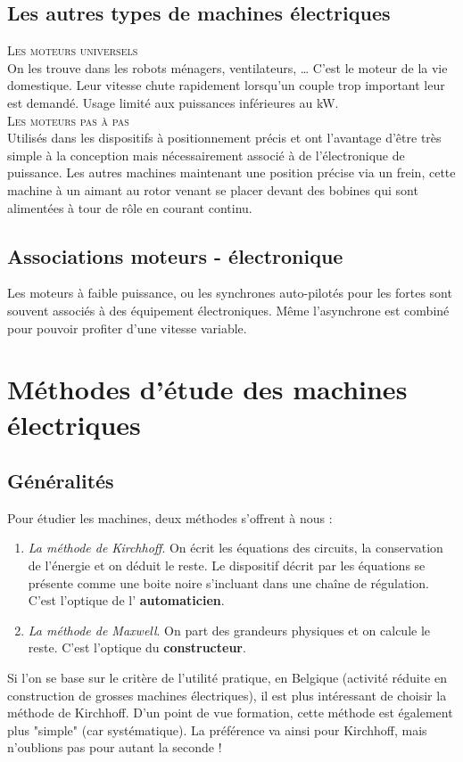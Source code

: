 	\subsection{Les autres types de machines électriques}
		\textsc{Les moteurs universels}\\
		On les trouve dans les robots ménagers, ventilateurs, \dots  
		C'est le moteur de la vie domestique. Leur vitesse chute 
		rapidement lorsqu'un couple trop important leur est demandé. Usage limité aux puissances inférieures au kW.\\
		
		\textsc{Les moteurs pas à pas}\\
		Utilisés dans les dispositifs à positionnement précis et ont 
		l'avantage d’être très simple à la conception mais nécessairement associé à de l'électronique de puissance. Les autres machines maintenant une position précise via un frein, cette machine à un aimant au rotor venant se placer devant des bobines qui sont alimentées à tour de rôle en courant continu. 
		
	\subsection{Associations moteurs - électronique}
	Les moteurs à faible puissance, ou les synchrones auto-pilotés pour 
	les fortes sont souvent associés à des équipement électroniques. Même l'asynchrone est combiné pour pouvoir profiter d'une vitesse variable. 
	
	
\section{Méthodes d'étude des machines électriques}
	\subsection{Généralités}
	Pour étudier les machines, deux méthodes s'offrent à nous :
	\begin{enumerate}
	\item \textit{La méthode de Kirchhoff}. On écrit les équations des 
	circuits, la conservation de l'énergie et on déduit le reste. Le 
	dispositif décrit par les équations se présente comme une boite noire 
	s'incluant dans une chaîne de régulation. C'est l'optique de l'
	\textbf{automaticien}.
	\item \textit{La méthode de Maxwell}. On part des grandeurs physiques 
	et on calcule le reste. C'est l'optique du \textbf{constructeur}.
	\end{enumerate}
	Si l'on se base sur le critère de l'utilité pratique, en Belgique (activité réduite en construction de grosses machines électriques), il 
	est plus intéressant de choisir la méthode de Kirchhoff. D'un point de 
	vue formation, cette méthode est également plus "simple" (car 
	systématique). La préférence va ainsi pour Kirchhoff, mais n'oublions 
	pas pour autant la seconde !
	
